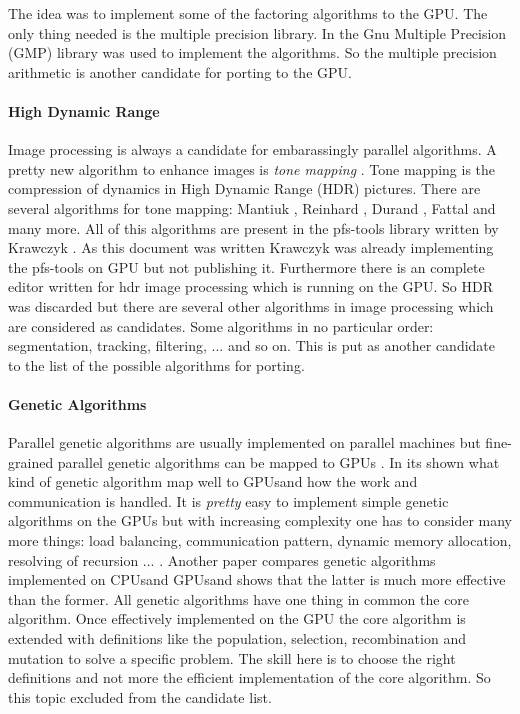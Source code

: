 The idea was to implement some of the factoring algorithms to the GPU. The only
thing needed is the multiple precision library. In \citep{citeulike:3783254} the
Gnu Multiple Precision (GMP) library was used to implement the algorithms. So
the multiple precision arithmetic is another candidate for porting to the GPU.

\paragraph{High Dynamic Range} %
\label{par:high_dynamic_range}
Image processing is always a candidate for embarassingly parallel algorithms. A
pretty new algorithm to enhance images is \emph{tone mapping}
\citep{citeulike:3783303}. Tone mapping is the compression of dynamics in High
Dynamic Range (HDR) pictures. There are several algorithms for tone mapping:
Mantiuk \citep{citeulike:3783315}, Reinhard \citep{citeulike:3783311}, Durand
\citep{citeulike:789299}, Fattal \citep{citeulike:3783313} and many more. All of
this algorithms are present in the pfs-tools library written by Krawczyk
\citep{citeulike:3783303}. As this document was written Krawczyk was already
implementing the pfs-tools on \gls{GPU} but not publishing it. Furthermore there is an
complete editor written for hdr image processing which is running on the GPU. So
HDR was discarded but there are several other algorithms in image processing
which are considered as candidates. Some algorithms in no particular order:
segmentation, tracking, filtering, ... and so on. This is put as another
candidate to the list of the possible algorithms for porting. 

\paragraph{Genetic Algorithms} %
\label{par:genetic_algorithms}
Parallel genetic algorithms are usually implemented on parallel machines but
fine-grained parallel genetic algorithms can be mapped to GPUs
\citep{citeulike:3801879}. In \citep{citeulike:3801866} its shown what kind of
genetic algorithm map well to \glspl{GPU}and how the work and communication is
handled. It is \emph{pretty} easy to implement simple genetic algorithms on the
GPUs but with increasing complexity one has to consider many more things: load
balancing, communication pattern, dynamic memory allocation, resolving of
recursion ... . Another paper \citep{citeulike:3801883} compares genetic
algorithms implemented on \glspl{CPU}and \glspl{GPU}and shows that the latter is much more
effective than the former. All genetic algorithms have one thing in common the
core algorithm. Once effectively implemented on the \gls{GPU} the core algorithm is
extended with definitions like the population, selection, recombination and
mutation to solve a specific problem. The skill here is to choose the right
definitions and not more the efficient implementation of the core algorithm. So
this topic excluded from the candidate list.

